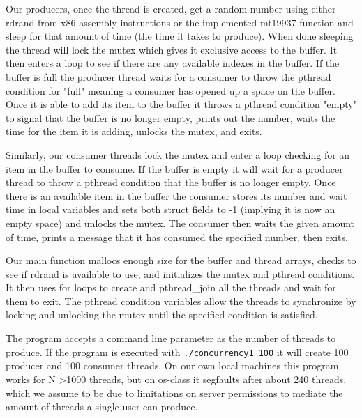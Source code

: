 \documentclass[10pt,letterpaper,draftclsnofoot,onecolumn]{IEEEtran}
\begin{document}
\medskip

\noindent Our producers, once the thread is created, get a random number using either rdrand from x86 assembly instructions or the implemented mt19937 function and sleep for that amount of time (the time it takes to produce). When done sleeping the thread will lock the mutex which gives it exclusive access to the buffer. It then enters a loop to see if there are any available indexes in the buffer. If the buffer is full the producer thread waits for a consumer to throw the pthread condition for "full" meaning a consumer has opened up a space on the buffer. Once it is able to add its item to the buffer it throws a pthread condition "empty" to signal that the buffer is no longer empty, prints out the number, waits the time for the item it is adding, unlocks the mutex, and exits.\par
\medskip

\medskip

\noindent Similarly, our consumer threads lock the mutex and enter a loop checking for an item in the buffer to consume. If the buffer is empty it will wait for a producer thread to throw a pthread condition that the buffer is no longer empty. Once there is an available item in the buffer the consumer stores its number and wait time in local variables and sets both struct fields to -1 (implying it is now an empty space) and unlocks the mutex. The consumer then waits the given amount of time, prints a message that it has consumed the specified number, then exits.\par
\medskip

\medskip

\noindent Our main function mallocs enough size for the buffer and thread arrays, checks to see if rdrand is available to use, and initializes the mutex and pthread conditions. It then uses for loops to create and pthread\_join all the threads and wait for them to exit. The pthread condition variables allow the threads to synchronize by locking and unlocking the mutex until the specified condition is satisfied.\par
\medskip

\medskip

\noindent The program accepts a command line parameter as the number of threads to produce. If the program is executed with \texttt{./concurrency1 100} it will create 100 producer and 100 consumer threads. On our own local machines this program works for N \textgreater 1000 threads, but on os-class it segfaults after about 240 threads, which we assume to be due to limitations on server permissions to mediate the amount of threads a single user can produce.\par
\bigskip
\end{document}
